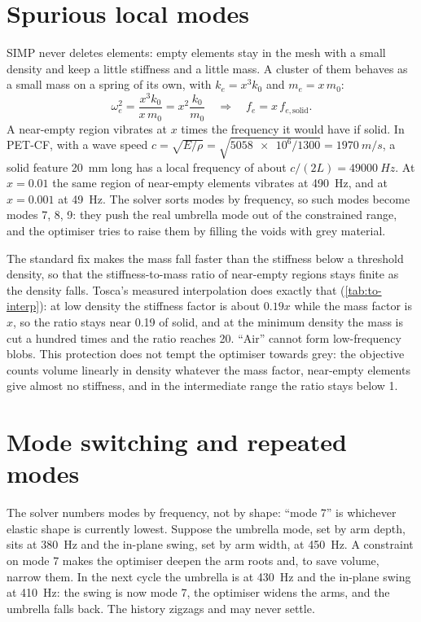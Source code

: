 \section{Spurious local modes}\label{sec:to-spurious}

SIMP never deletes elements: empty elements stay in the mesh with a small density and keep a little stiffness and a little mass. A cluster of them behaves as a small mass on a spring of its own, with $k_e = x^3 k_0$ and $m_e = x\,m_0$:
\begin{equation}
\omega_e^2 = \frac{x^3 k_0}{x\, m_0} = x^2\frac{k_0}{m_0} \quad\Rightarrow\quad f_e = x\, f_{e,\text{solid}}.
\end{equation}
A near-empty region vibrates at $x$ times the frequency it would have if solid. In PET-CF, with a wave speed $c = \sqrt{E/\rho} = \sqrt{\num{5058e6}/1300} = \SI{1970}{m/s}$, a solid feature \SI{20}{mm} long has a local frequency of about $c/(2L) = \SI{49000}{Hz}$. At $x = 0.01$ the same region of near-empty elements vibrates at \SI{490}{Hz}, and at $x = 0.001$ at \SI{49}{Hz}. The solver sorts modes by frequency, so such modes become modes 7, 8, 9: they push the real umbrella mode out of the constrained range, and the optimiser tries to raise them by filling the voids with grey material.

The standard fix makes the mass fall faster than the stiffness below a threshold density, so that the stiffness-to-mass ratio of near-empty regions stays finite as the density falls. Tosca's measured interpolation does exactly that (\cref{tab:to-interp}): at low density the stiffness factor is about $0.19x$ while the mass factor is $x$, so the ratio stays near 0.19 of solid, and at the minimum density the mass is cut a hundred times and the ratio reaches 20. ``Air'' cannot form low-frequency blobs. This protection does not tempt the optimiser towards grey: the objective counts volume linearly in density whatever the mass factor, near-empty elements give almost no stiffness, and in the intermediate range the ratio stays below 1.

\section{Mode switching and repeated modes}\label{sec:to-switching}

The solver numbers modes by frequency, not by shape: ``mode 7'' is whichever elastic shape is currently lowest. Suppose the umbrella mode, set by arm depth, sits at \SI{380}{Hz} and the in-plane swing, set by arm width, at \SI{450}{Hz}. A constraint on mode 7 makes the optimiser deepen the arm roots and, to save volume, narrow them. In the next cycle the umbrella is at \SI{430}{Hz} and the in-plane swing at \SI{410}{Hz}: the swing is now mode 7, the optimiser widens the arms, and the umbrella falls back. The history zigzags and may never settle.

